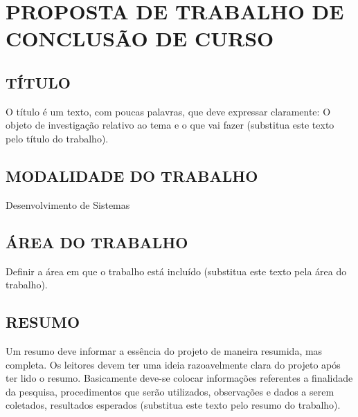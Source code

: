 
\chapter{PROPOSTA DE TRABALHO DE CONCLUSÃO DE CURSO}
\label{chap:proposta}

\section{TÍTULO}
\label{sec:titulo}
O título é um texto, com poucas palavras, que deve expressar claramente: O objeto de investigação relativo ao tema e o que vai fazer (substitua este texto pelo título do trabalho).
\thetitle

\section{MODALIDADE DO TRABALHO}
\label{sec:modalidade}
Desenvolvimento de Sistemas

\section{ÁREA DO TRABALHO}
\label{sec:area}
Definir a área em que o trabalho está incluído (substitua este texto pela área do trabalho).

\section{RESUMO}
\label{sec:resumo}
Um resumo deve informar a essência do projeto de maneira resumida, mas completa. Os leitores devem ter uma ideia razoavelmente clara do projeto após ter lido o resumo. Basicamente deve-se colocar informações referentes a finalidade da pesquisa, procedimentos que serão utilizados, observações e dados a serem coletados, resultados esperados (substitua este texto pelo resumo do trabalho).

